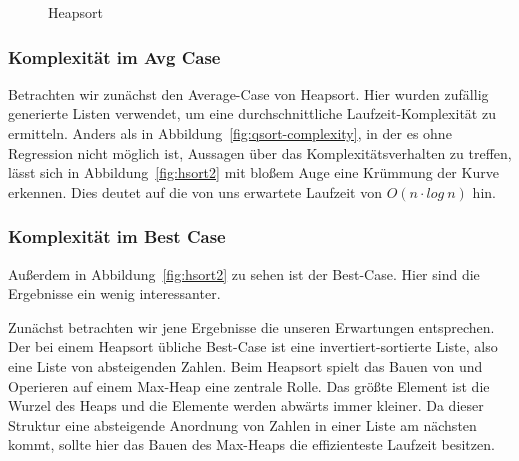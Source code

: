 \begin{figure}[hbt]
    \centering
    \caption{Heapsort}
\end{figure}

\subsubsection{Komplexität im Avg Case}\label{subsec:Komplexitaet im
Average-Case}

Betrachten wir zunächst den Average-Case von Heapsort.
Hier wurden zufällig generierte Listen verwendet, um eine durchschnittliche
Laufzeit-Komplexität zu ermitteln.
Anders als in Abbildung~\ref{fig:qsort-complexity}, in der es ohne Regression
nicht möglich ist, Aussagen über das Komplexitätsverhalten zu treffen, lässt
sich in Abbildung~\ref{fig:hsort2} mit bloßem Auge eine Krümmung der Kurve
erkennen.
Dies deutet auf die von uns erwartete Laufzeit von \(O(n\cdot log\ n)\) hin.

\subsubsection{Komplexität im Best Case}\label{subsec:Komplexitaet im Best-Case}

Außerdem in Abbildung~\ref{fig:hsort2} zu sehen ist der Best-Case.
Hier sind die Ergebnisse ein wenig interessanter.

Zunächst betrachten wir jene Ergebnisse die unseren Erwartungen entsprechen.
Der bei einem Heapsort übliche Best-Case ist eine invertiert-sortierte Liste,
also eine Liste von absteigenden Zahlen.
Beim Heapsort spielt das Bauen von und Operieren auf einem Max-Heap eine
zentrale Rolle.
Das größte Element ist die Wurzel des Heaps und die Elemente werden abwärts
immer kleiner.
Da dieser Struktur eine absteigende Anordnung von Zahlen in einer Liste am
nächsten kommt, sollte hier das Bauen des Max-Heaps die effizienteste
Laufzeit besitzen.


